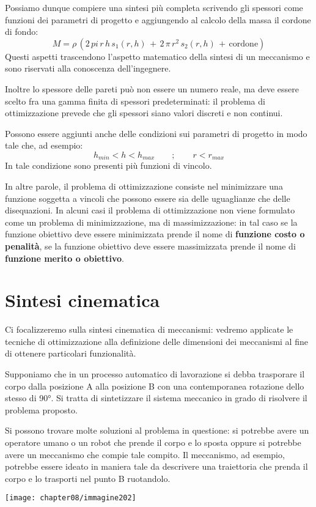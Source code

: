 Possiamo dunque compiere una sintesi più completa scrivendo gli spessori come funzioni dei parametri di progetto e aggiungendo al calcolo della massa il cordone di fondo:
\[M = \rho\,(2\,pi\,r\,h\,s_1(r,h)\,+\,2\,\pi\,r^2\,s_2(r,h)\,+\,\text{cordone})\]
Questi aspetti trascendono l'aspetto matematico della sintesi di un meccanismo e sono riservati alla conoscenza dell'ingegnere.

Inoltre lo spessore delle pareti può non essere un numero reale, ma deve essere scelto fra una gamma finita di spessori predeterminati: il problema di ottimizzazione prevede che gli spessori siano valori discreti e non continui.

Possono essere aggiunti anche delle condizioni sui parametri di progetto in modo tale che, ad esempio:
\[h_{min} < h < h_{max}\qquad;\qquad r < r_{max}\]
In tale condizione sono presenti più funzioni di vincolo.

In altre parole, il problema di ottimizzazione consiste nel minimizzare una funzione soggetta a vincoli che possono essere sia delle uguaglianze che delle disequazioni. In alcuni casi il problema di ottimizzazione non viene formulato come un problema di minimizzazione, ma di massimizzazione: in tal caso se la funzione obiettivo deve essere minimizzata prende il nome di \textbf{funzione costo o penalità}, se la funzione obiettivo deve essere massimizzata prende il nome di \textbf{funzione merito o obiettivo}.

\section{Sintesi cinematica}

Ci focalizzeremo sulla sintesi cinematica di meccanismi: vedremo applicate le tecniche di ottimizzazione alla definizione delle dimensioni dei meccanismi al fine di ottenere particolari funzionalità.

Supponiamo che in un processo automatico di lavorazione si debba trasporare il corpo dalla posizione A alla posizione B con una contemporanea rotazione dello stesso di 90°. Si tratta di sintetizzare il sistema meccanico in grado di risolvere il problema proposto.

Si possono trovare molte soluzioni al problema in questione: si potrebbe avere un operatore umano o un robot che prende il corpo e lo sposta oppure si potrebbe avere un meccanismo che compie tale compito. Il meccanismo, ad esempio, potrebbe essere ideato in maniera tale da descrivere una traiettoria che prenda il corpo e lo trasporti nel punto B ruotandolo.
\begin{center}
\texttt{[image: chapter08/immagine202]}
\end{center}

